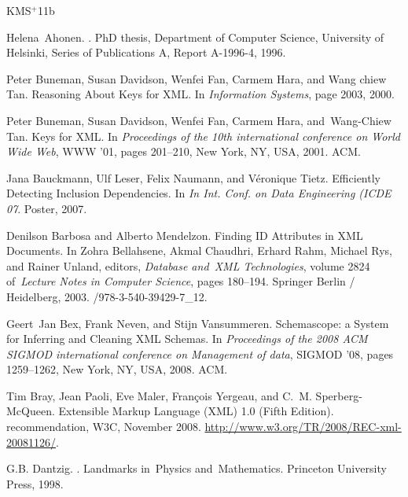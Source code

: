 \newcommand{\etalchar}[1]{$^{#1}$}
\begin{thebibliography}{KMS{\etalchar{+}}11b}

Helena~Ahonen.
.
\newblock PhD thesis, Department of Computer Science, University of Helsinki, Series of Publications A, Report A-1996-4, 1996.

\bibitem[BDF{\etalchar{+}}00]{fajt-12}
Peter Buneman, Susan Davidson, Wenfei Fan, Carmem Hara, and Wang chiew Tan.
\newblock Reasoning About Keys for XML.
\newblock In {\em Information Systems}, page 2003, 2000.

\bibitem[BDF{\etalchar{+}}01]{keX}
Peter Buneman, Susan Davidson, Wenfei Fan, Carmem Hara, and~Wang-Chiew Tan.
\newblock Keys for XML.
\newblock In {\em Proceedings of the 10th international conference on World Wide Web}, WWW '01, pages 201--210, New York, NY, USA, 2001. ACM.

Jana Bauckmann, Ulf Leser, Felix Naumann, and Véronique Tietz.
\newblock Efficiently Detecting Inclusion Dependencies.
\newblock In {\em In Int. Conf. on Data Engineering (ICDE 07}. Poster, 2007.

Denilson Barbosa and Alberto Mendelzon.
\newblock Finding ID Attributes in XML Documents.
\newblock In Zohra Bellahsene, Akmal Chaudhri, Erhard Rahm, Michael Rys, and Rainer Unland, editors, {\em Database and~XML Technologies}, volume 2824 of~{\em Lecture Notes in Computer Science}, pages 180--194. Springer Berlin / Heidelberg, 2003.
/978-3-540-39429-7\_12.

Geert~Jan Bex, Frank Neven, and Stijn Vansummeren.
\newblock Schemascope: a System for Inferring and Cleaning XML Schemas.
\newblock In {\em Proceedings of the 2008 ACM SIGMOD international conference on Management of data}, SIGMOD '08, pages 1259--1262, New York, NY, USA, 2008. ACM.

\bibitem[BPM{\etalchar{+}}08]{Bray:08:EML}
Tim Bray, Jean Paoli, Eve Maler, Fran\c{c}ois Yergeau, and C.~M. Sperberg-McQueen.
\newblock Extensible Markup Language ({XML}) 1.0 (Fifth Edition).
 recommendation, W3C, November 2008.
\newblock \url{http://www.w3.org/TR/2008/REC-xml-20081126/}.

G.B. Dantzig.
.
\newblock Landmarks in~Physics and~Mathematics. Princeton University Press, 1998.


\end{thebibliography}
